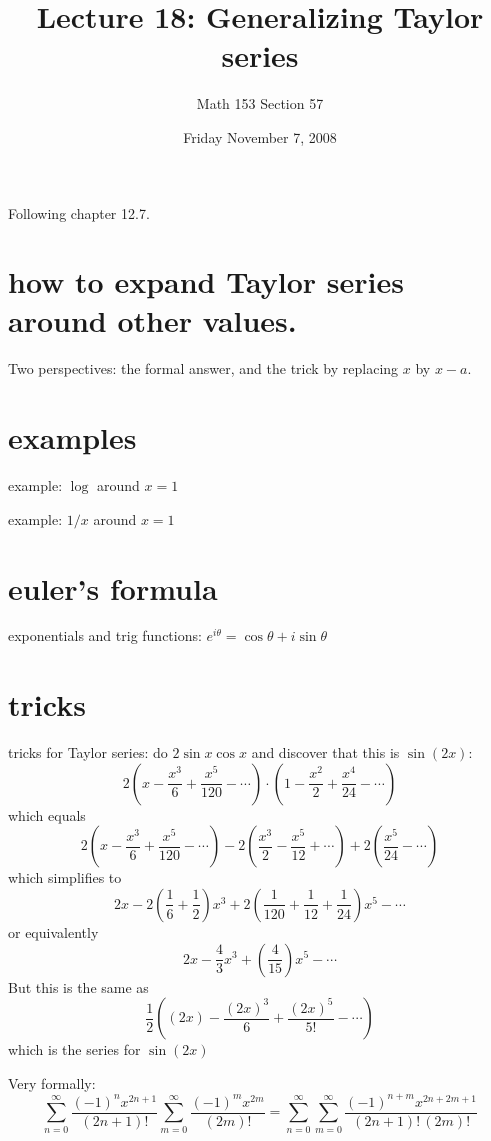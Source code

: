 \documentclass[12pt]{article}
\title{Lecture 18: Generalizing Taylor series}
\author{Math 153 Section 57}
\date{Friday November  7, 2008}
\begin{document}
\maketitle

Following chapter 12.7.

\section{how to expand Taylor series around other values.}

Two perspectives: the formal answer, and the trick by replacing $x$ by $x-a$.

\section{examples}

example: $\log$ around $x=1$

example: $1/x$ around $x=1$

\section{euler's formula}

exponentials and trig functions: $e^{i\theta} = \cos \theta + i \sin \theta$

\section{tricks}

tricks for Taylor series: do $2 \sin x \cos x$ and discover that this is $\sin (2x)$:
$$
2 \left( x - \frac{x^3}{6} + \frac{x^5}{120} - \cdots \right) \cdot 
\left( 1 - \frac{x^2}{2} + \frac{x^4}{24} - \cdots \right)
$$
which equals
$$
2 \left( x - \frac{x^3}{6} + \frac{x^5}{120} - \cdots \right) -
2 \left( \frac{x^3}{2} - \frac{x^5}{12} + \cdots \right) + 
2 \left( \frac{x^5}{24} - \cdots \right)
$$
which simplifies to
$$
2x - 2 \left(\frac{1}{6} + \frac{1}{2}\right) x^3 + 2 \left(\frac{1}{120} + \frac{1}{12} + \frac{1}{24}\right) x^5 - \cdots
$$
or equivalently
$$
2x - \frac{4}{3} x^3 + \left(\frac{4}{15} \right) x^5 - \cdots
$$
But this is the same as
$$
\frac{1}{2} \left( (2x) - \frac{(2x)^3}{6} + \frac{(2x)^5}{5!} - \cdots \right)
$$
which is the series for $\sin (2x)$

Very formally:
$$
\sum_{n=0}^\infty \frac{(-1)^n x^{2n+1}}{(2n+1)!} 
\sum_{m=0}^\infty \frac{(-1)^m x^{2m}}{(2m)!} =
\sum_{n=0}^\infty \sum_{m=0}^\infty \frac{(-1)^{n+m} x^{2n+2m+1}}{(2n+1)! \, (2m)!}
$$
\end{document}
